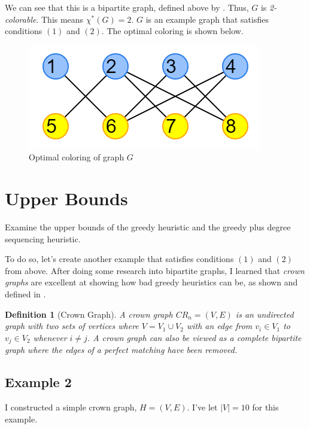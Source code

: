 \documentclass{article}
\newtheorem*{definition}{Definition}
\begin{document}
We can see that this is a bipartite graph, defined above by \cite{bondymurty}. Thus, \(G\) is \emph{2-colorable}. This means \(\chi^{*}(G) = 2\). \(G\) is an example graph that satisfies conditions \((1)\) and \((2)\). The optimal coloring is shown below.

\begin{figure}[H]
\centering
\includegraphics[scale=0.6]{images/graph-3.png}
\caption{Optimal coloring of graph \(G\)}
\end{figure}

\section*{Upper Bounds}
Examine the upper bounds of the greedy heuristic and the greedy plus degree sequencing heuristic. \newline

To do so, let's create another example that satisfies conditions \((1)\) and \((2)\) from above. After doing some research into bipartite graphs, I learned that \emph{crown graphs} are excellent at showing how bad greedy heuristics can be, as shown and defined in \cite{kordecki}.

\begin{definition}[Crown Graph]
A crown graph \(CR_n = (V, E)\) is an undirected graph with two sets of vertices where \(V = V_1 \cup V_2\) with an edge from \(v_i \in V_1\) to \(v_{j} \in V_2\) whenever \(i \neq j\). A crown graph can also be viewed as a complete bipartite graph where the edges of a perfect matching have been removed.
\end{definition}

\subsection*{Example 2}

I constructed a simple crown graph, \(H = (V, E)\). I've let \(|V| = 10\) for this example.
\end{document}
